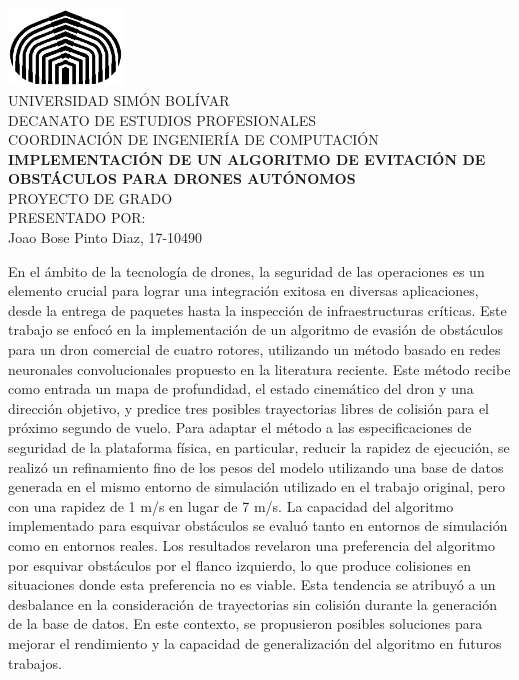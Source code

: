 \begin{titlepage}
    \begin{center}

        \includegraphics[width=1.2in]{partes/usb.png} \\
        \textsc {\large UNIVERSIDAD SIMÓN BOLÍVAR} \\
        \textsc{DECANATO DE ESTUDIOS PROFESIONALES\\
        COORDINACIÓN DE INGENIERÍA DE COMPUTACIÓN}\\ 
        \vfill
        \textbf{IMPLEMENTACIÓN DE UN ALGORITMO DE EVITACIÓN DE OBSTÁCULOS PARA DRONES AUTÓNOMOS} \\
        \vfill
        PROYECTO DE GRADO \\
        PRESENTADO POR: \\
        Joao Bose Pinto Diaz, 17-10490

    \end{center}
\vspace{-0.25cm}
\abstract
{   

En el ámbito de la tecnología de drones, la seguridad de las operaciones es un elemento crucial para lograr una integración exitosa en diversas aplicaciones, desde la entrega de paquetes hasta la inspección de infraestructuras críticas. Este trabajo se enfocó en la implementación de un algoritmo de evasión de obstáculos para un dron comercial de cuatro rotores, utilizando un método basado en redes neuronales convolucionales propuesto en la literatura reciente. Este método recibe como entrada un mapa de profundidad, el estado cinemático del dron y una dirección objetivo, y predice tres posibles trayectorias libres de colisión para el próximo segundo de vuelo. Para adaptar el método a las especificaciones de seguridad de la plataforma física, en particular, reducir la rapidez de ejecución, se realizó un refinamiento fino de los pesos del modelo utilizando una base de datos generada en el mismo entorno de simulación utilizado en el trabajo original, pero con una rapidez de 1 m/s en lugar de 7 m/s. La capacidad del algoritmo implementado para esquivar obstáculos se evaluó tanto en entornos de simulación como en entornos reales. Los resultados revelaron una preferencia del algoritmo por esquivar obstáculos por el flanco izquierdo, lo que produce colisiones en situaciones donde esta preferencia no es viable. Esta tendencia se atribuyó a un desbalance en la consideración de trayectorias sin colisión durante la generación de la base de datos. En este contexto, se propusieron posibles soluciones para mejorar el rendimiento y la capacidad de generalización del algoritmo en futuros trabajos.

}
\end{titlepage}
